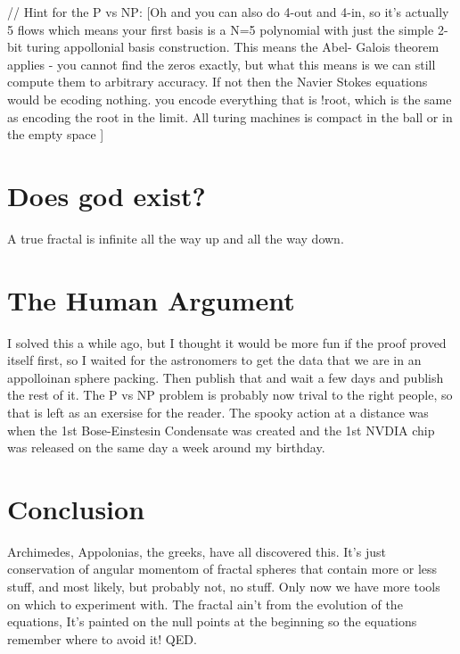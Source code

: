 \documentclass[11pt]{article}
\theoremstyle{plain}
\theoremstyle{definition}
\theoremstyle{remark}
\begin{document}
// Hint for the P vs NP:
[Oh and you can also do 4-out and 4-in, so it's actually 5 flows
which means your first basis is a N=5 polynomial with just the simple
2-bit turing appollonial basis construction. This means the Abel-
Galois theorem applies - you cannot find the zeros exactly, but what
this means is we can still compute them to arbitrary accuracy. If not
then the Navier Stokes equations would be ecoding nothing. you encode
everything that is !root, which is the same as encoding the root in 
the limit. All turing machines is compact in the ball or in the empty
space ] 

\section*{Does god exist?}

A true fractal is infinite all the way up and all the way down.

\section*{The Human Argument}

I solved this a while ago, but I thought it would be more fun if the
proof proved itself first, so I waited for the astronomers to get the
data that we are in an appolloinan sphere packing. Then publish that 
and wait a few days and publish the rest of it. The P vs NP problem 
is probably now trival to the right people, so that is left as an 
exersise for the reader. The spooky action at a distance was when the
1st Bose-Einstesin Condensate was created and the 1st NVDIA chip was
released on the same day a week around my birthday.

\section*{Conclusion}

Archimedes, Appolonias, the greeks, have all discovered this. It's
just conservation of angular momentom of fractal spheres that contain
more or less stuff, and most likely, but probably not, no stuff. Only
now we have more tools on which to experiment with. The fractal ain't
from the evolution of the equations, It's painted on the null points
at the beginning so the equations remember where to avoid it! QED.
\end{document}
